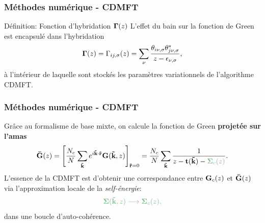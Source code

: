 \begin{frame}
    \frametitle{Méthodes numérique - CDMFT}
    \begin{defblock}{Définition: Fonction d'hybridation $\vb{\Gamma}(z)$}
       L'effet du bain sur la fonction de Green est encapsulé dans l'hybridation
        \begin{align}
          \vb{\Gamma}(z) = \Gamma_{ij,\sigma}(z) = \sum_\nu\frac{\theta_{i\nu,\sigma}\theta^*_{j\nu,\sigma}}{z - \epsilon_{\nu,\sigma}},
          \label{eq: hybridization}
        \end{align}
        à l'intérieur de laquelle sont stockés les paramètres variationnels de l'algorithme
        CDMFT.
    \end{defblock}
\end{frame}

\begin{frame}
    \frametitle{Méthodes numérique - CDMFT}
    Grâce au formalisme de base mixte, on calcule la fonction de Green
    \textbf{projetée sur l'amas}
    \begin{align}
        \vb{\Bar{G}}(z) = \Bigg[\frac{N_c}{N}\sum_{\vb{\Tilde{k}}}e^{i\vb{\Tilde{k}}\cdot\vb{\Tilde{r}}}\vb{G}(\vb{\Tilde{k}}, z)\Bigg]_{\vb{\Tilde{r}}=0}
        = \frac{N_c}{N}\sum_{\vb{\tilde{k}}}\frac{1}{z - \vb{t}(\vb{\tilde{k}}) - \textcolor{hard_green}{\vb{\Sigma}_c(z)}}.
    \end{align}
    \pause
    \vfill
    L'essence de la CDMFT est d'obtenir une correspondance entre
    $\vb{G}_c(z)$ et $\vb{\Bar{G}}(z)$ via \textcolor{hard_green}{l'approximation locale de la \textit{self-énergie}:}
    \begin{align}
        \textcolor{hard_green}
        {\vb{\Sigma}(\vb{\tilde{k}}, z)\longrightarrow\vb{\Sigma}_c(z),}
    \end{align}
    dans une boucle d'auto-cohérence.
\end{frame}

